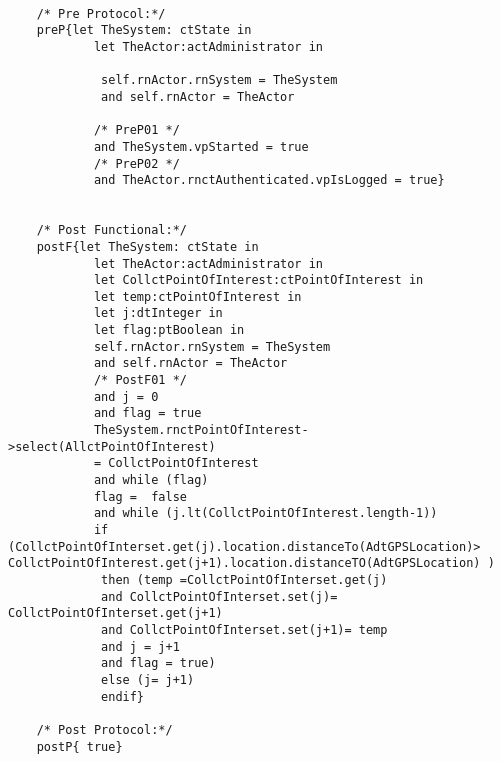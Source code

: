 	\scriptsize
	\vspace{0.5cm}
	\begin{lstlisting}[style=MessirStyle,firstnumber=auto,captionpos=b,caption={\msrmessir (MCL-oriented) specification of the operation \emph{oeClosestToALocation}.},label=OM-actAdministrator-oeClosestToALocation-MCL-LST]

	/* Pre Protocol:*/ 
	preP{let TheSystem: ctState in
	  		let TheActor:actAdministrator in
	  
	 		 self.rnActor.rnSystem = TheSystem
	 		 and self.rnActor = TheActor
	  
			/* PreP01 */
	  		and TheSystem.vpStarted = true
			/* PreP02 */
	  		and TheActor.rnctAuthenticated.vpIsLogged = true}
	
	
	/* Post Functional:*/ 
	postF{let TheSystem: ctState in
	  		let TheActor:actAdministrator in
	  		let CollctPointOfInterest:ctPointOfInterest in
	  		let temp:ctPointOfInterest in
	  		let j:dtInteger in
	  		let flag:ptBoolean in
	  		self.rnActor.rnSystem = TheSystem
	  		and self.rnActor = TheActor
			/* PostF01 */
			and j = 0
			and flag = true
	  		TheSystem.rnctPointOfInterest->select(AllctPointOfInterest)
	 		= CollctPointOfInterest
	 		and while (flag)
	 		flag =  false 
	 		and while (j.lt(CollctPointOfInterest.length-1))
	 		if (CollctPointOfInterset.get(j).location.distanceTo(AdtGPSLocation)> CollctPointOfInterest.get(j+1).location.distanceTO(AdtGPSLocation) )
	 		 then (temp =CollctPointOfInterset.get(j) 
	 		 and CollctPointOfInterset.set(j)= CollctPointOfInterset.get(j+1)
	 		 and CollctPointOfInterset.set(j+1)= temp 
	 		 and j = j+1
	 		 and flag = true)
	 		 else (j= j+1) 
	 		 endif}
	
	/* Post Protocol:*/ 
	postP{ true}
	
	\end{lstlisting}
	\normalsize 
	
	
	
	





